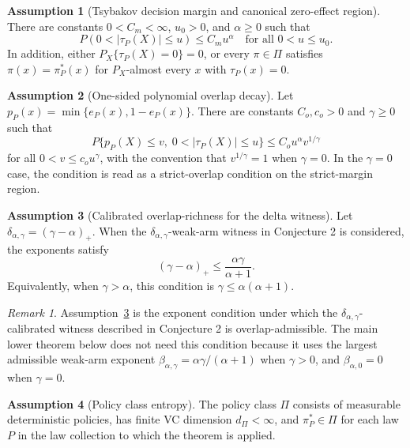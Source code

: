 \documentclass[11pt]{article}
\theoremstyle{definition}
\newtheorem{assumption}{Assumption}
\theoremstyle{plain}
\theoremstyle{remark}
\newtheorem{remark}{Remark}
\begin{document}
\begin{assumption}[Tsybakov decision margin and canonical zero-effect region]\label{ass:margin}
There are constants \(0<C_m<\infty\), \(u_0>0\), and \(\alpha\ge0\) such that
\[
P(0<|\tau_P(X)|\le u)\le C_m u^\alpha
\quad\text{for all }0<u\le u_0.
\]
In addition, either \(P_X\{\tau_P(X)=0\}=0\), or every
\(\pi\in\Pi\) satisfies \(\pi(x)=\pi_P^*(x)\) for \(P_X\)-almost every
\(x\) with \(\tau_P(x)=0\).
\end{assumption}

\begin{assumption}[One-sided polynomial overlap decay]\label{ass:overlap-decay}
Let \(p_P(x)=\min\{e_P(x),1-e_P(x)\}\).  There are constants
\(C_o,c_o>0\) and \(\gamma\ge0\) such that
\[
P\{p_P(X)\le v,\;0<|\tau_P(X)|\le u\}
  \le C_o u^\alpha v^{1/\gamma}
\]
for all \(0<v\le c_o u^\gamma\), with the convention that \(v^{1/\gamma}=1\)
when \(\gamma=0\).  In the \(\gamma=0\) case, the condition is read as a
strict-overlap condition on the strict-margin region.
\end{assumption}

\begin{assumption}[Calibrated overlap-richness for the delta witness]\label{ass:calibrated-overlap-richness}
Let \(\delta_{\alpha,\gamma}=(\gamma-\alpha)_+\).  When the
\(\delta_{\alpha,\gamma}\)-weak-arm witness in Conjecture 2 is considered,
the exponents satisfy
\[
(\gamma-\alpha)_+
\le \frac{\alpha\gamma}{\alpha+1}.
\]
Equivalently, when \(\gamma>\alpha\), this condition is
\(\gamma\le\alpha(\alpha+1)\).
\end{assumption}

\begin{remark}
Assumption~\ref{ass:calibrated-overlap-richness} is the exponent condition
under which the \(\delta_{\alpha,\gamma}\)-calibrated witness described in
Conjecture 2 is overlap-admissible.  The main lower theorem below does not
need this condition because it uses the largest admissible weak-arm exponent
\(\beta_{\alpha,\gamma}=\alpha\gamma/(\alpha+1)\) when \(\gamma>0\), and
\(\beta_{\alpha,0}=0\) when \(\gamma=0\).
\end{remark}

\begin{assumption}[Policy class entropy]\label{ass:policy-class}
The policy class \(\Pi\) consists of measurable deterministic policies, has
finite VC dimension \(d_\Pi<\infty\), and \(\pi_P^*\in\Pi\) for each law
\(P\) in the law collection to which the theorem is applied.
\end{assumption}
\end{document}
